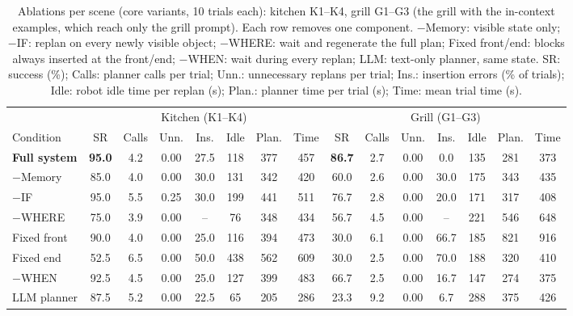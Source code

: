 \begin{table}[t]
\centering
\footnotesize
\setlength{\tabcolsep}{3pt}
\renewcommand{\arraystretch}{0.95}
\caption{Ablations per scene (core variants, 10 trials each): kitchen K1--K4, grill G1--G3 (the
grill with the in-context examples, which reach only the grill prompt). Each row removes one
component. $-$Memory: visible state only; $-$IF: replan on every
newly visible object; $-$WHERE: wait and regenerate the full plan; Fixed front/end: blocks
always inserted at the front/end; $-$WHEN: wait during every replan; LLM: text-only planner,
same state. SR: success (\%); Calls: planner calls per trial; Unn.: unnecessary replans per
trial; Ins.: insertion errors (\% of trials); Idle: robot idle time per replan (s); Plan.:
planner time per trial (s); Time: mean trial time (s).}
\label{tab:ablations}
\begin{tabular*}{\textwidth}{@{\extracolsep{\fill}}l ccccccc @{\hspace{10pt}} ccccccc@{}}
\toprule
 & \multicolumn{7}{c}{Kitchen (K1--K4)} & \multicolumn{7}{c}{Grill (G1--G3)} \\
\cmidrule(r){2-8}\cmidrule(l){9-15}
Condition & SR & Calls & Unn. & Ins. & Idle & Plan. & Time & SR & Calls & Unn. & Ins. & Idle & Plan. & Time \\
\midrule
\textbf{Full system} & \textbf{95.0} & 4.2 & 0.00 & 27.5 & 118 & 377 & 457 & \textbf{86.7} & 2.7 & 0.00 & 0.0  & 135 & 281 & 373 \\
\midrule
$-$Memory            & 85.0 & 4.0 & 0.00 & 30.0 & 131 & 342 & 420 & 60.0 & 2.6 & 0.00 & 30.0 & 175 & 343 & 435 \\
$-$IF                & 95.0 & 5.5 & 0.25 & 30.0 & 199 & 441 & 511 & 76.7 & 2.8 & 0.00 & 20.0 & 171 & 317 & 408 \\
$-$WHERE             & 75.0 & 3.9 & 0.00 & --   & 76  & 348 & 434 & 56.7 & 4.5 & 0.00 & --   & 221 & 546 & 648 \\
Fixed front          & 90.0 & 4.0 & 0.00 & 25.0 & 116 & 394 & 473 & 30.0 & 6.1 & 0.00 & 66.7 & 185 & 821 & 916 \\
Fixed end            & 52.5 & 6.5 & 0.00 & 50.0 & 438 & 562 & 609 & 30.0 & 2.5 & 0.00 & 70.0 & 188 & 320 & 410 \\
$-$WHEN              & 92.5 & 4.5 & 0.00 & 25.0 & 127 & 399 & 483 & 66.7 & 2.5 & 0.00 & 16.7 & 147 & 274 & 375 \\
LLM planner          & 87.5 & 5.2 & 0.00 & 22.5 & 65  & 205 & 286 & 23.3 & 9.2 & 0.00 & 6.7  & 288 & 375 & 426 \\
\bottomrule
\end{tabular*}
\end{table}


